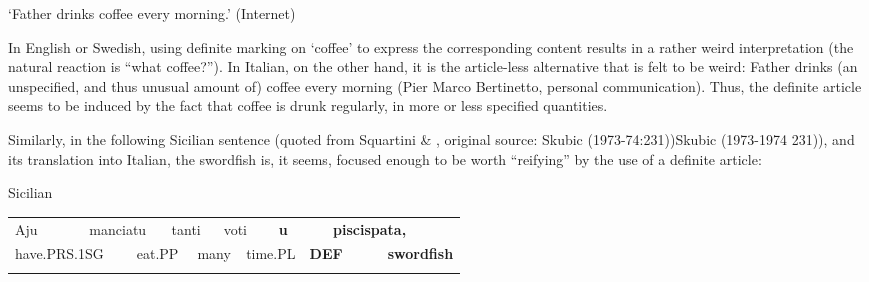 \begin{styleTranslation}
‘Father drinks coffee every morning.’ (Internet)

\end{styleTranslation}

\begin{styleBodyTextFirst}
In English or Swedish, using definite marking on ‘coffee’ to express the corresponding content results in a rather weird interpretation (the natural reaction is “what coffee?”). In Italian, on the other hand, it is the article-less alternative that is felt to be weird: Father drinks (an unspecified, and thus unusual amount of) coffee every morning (Pier Marco Bertinetto, personal communication). Thus, the definite article seems to be induced by the fact that coffee is drunk regularly, in more or less specified quantities. 

\end{styleBodyTextFirst}

\begin{styleBodytextC}
Similarly, in the following Sicilian sentence (quoted from Squartini \& \citet[413]{Bertinetto2000}, original source: Skubic (1973-74:231))Skubic (1973-1974 231)), and its translation into Italian, the swordfish is, it seems, focused enough to be worth “reifying” by the use of a definite article:

\end{styleBodytextC}

\begin{listWWNumileveli}
\item 

\end{listWWNumileveli}

\begin{listWWNumlviileveli}
\item 

\begin{styleExLtrTbl}
Sicilian

\end{styleExLtrTbl}

\end{listWWNumlviileveli}

\begin{tabular}{llllllllllll}
\lsptoprule
Aju & \multicolumn{2}{l}{manciatu

} & \multicolumn{2}{l}{tanti

} & \multicolumn{2}{l}{voti

} & \multicolumn{2}{l}{{\bfseries u}

} & \multicolumn{2}{l}{{\bfseries piscispata,}

} & \\
\multicolumn{2}{l}{have.PRS.1SG

} & \multicolumn{2}{l}{eat.PP

} & \multicolumn{2}{l}{many

} & \multicolumn{2}{l}{time.PL

} & \multicolumn{2}{l}{{\bfseries DEF}

} & \multicolumn{2}{l}{{\bfseries swordfish}

}\\
\lspbottomrule
\end{tabular}

